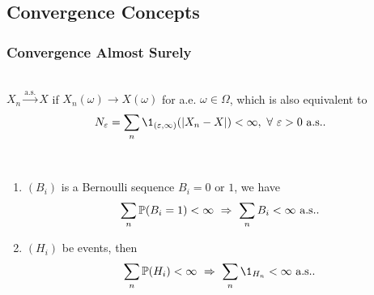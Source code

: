 \vspace{6pt}
\subsection{Convergence Concepts}

\subsubsection{Convergence Almost Surely}
\begin{definition}\ \\
$X_n \overset{\text{a.s.}}{\longrightarrow} X$ if $X_n(\omega) \to X(\omega)$ for a.e. $\omega \in \Omega$, which is also equivalent to
\begin{equation*}
    N_\vep = \sum_n \1_{(\vep, \infty)} (\abs{X_n - X}) < \infty,\ \forall\ \vep > 0\ \text{a.s.}.
\end{equation*}
\end{definition}

\vspace{6pt}
\begin{lemma}\label{BCL}\ 
\begin{enumerate}[label = (\arabic*)]
    \item $(B_i)$ is a Bernoulli sequence $B_i = 0 \text{ or } 1$, we have
    \begin{equation*}
        \sum_n \P(B_i = 1) < \infty\ \Rightarrow\ \sum_n B_i < \infty \text{ a.s.}.
    \end{equation*}
    \item $(H_i)$ be events, then
    \begin{equation*}
        \sum_n \P(H_i) < \infty\ \Rightarrow\ \sum_n \1_{H_n} < \infty \text{ a.s.}.
    \end{equation*}
\end{enumerate}
\end{lemma}

